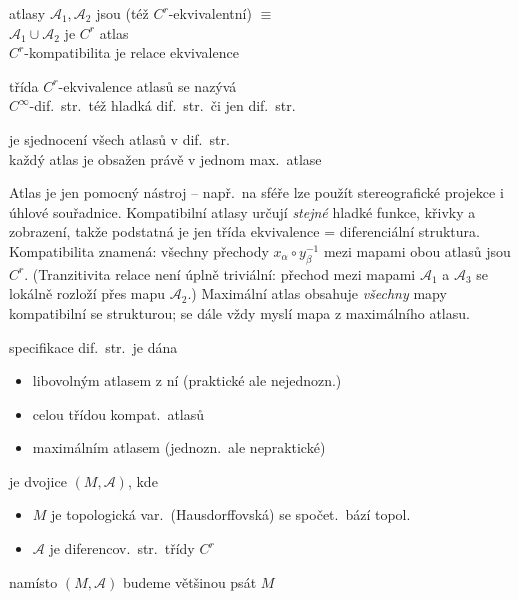 \begin{definice}
atlasy $\mathcal{A}_1,\mathcal{A}_2$ jsou  (též $C^r$-ekvivalentní) $\equiv$ \\
\quad $\mathcal{A}_1\cup\mathcal{A}_2$ je $C^r$ atlas \\
$C^r$-kompatibilita je relace ekvivalence
\end{definice}

\begin{definice}
třída $C^r$-ekvivalence atlasů se nazývá  \\
$C^\infty$-dif.\ str.\ též hladká dif.\ str.\ či jen dif.\ str.
\end{definice}

\begin{definice}
 je sjednocení všech atlasů v dif.\ str. \\
každý atlas je obsažen právě v jednom max.\ atlase
\end{definice}

\begin{vysvetleni}
Atlas je jen pomocný nástroj -- např.\ na sféře lze použít stereografické projekce i úhlové souřadnice. Kompatibilní atlasy určují \emph{stejné} hladké funkce, křivky a zobrazení, takže podstatná je jen třída ekvivalence = diferenciální struktura. Kompatibilita znamená: všechny  přechody $x_\alpha\circ y_\beta^{-1}$ mezi mapami obou atlasů jsou $C^r$. (Tranzitivita relace není úplně triviální: přechod mezi mapami $\mathcal{A}_1$ a $\mathcal{A}_3$ se lokálně rozloží přes mapu $\mathcal{A}_2$.) Maximální atlas obsahuje \emph{všechny} mapy kompatibilní se strukturou;  se dále vždy myslí mapa z maximálního atlasu.
\end{vysvetleni}

specifikace dif.\ str.\ je dána
\begin{itemize}[nosep]
  \item[--] libovolným atlasem z ní \hfill (praktické ale nejednozn.)
  \item[--] celou třídou kompat.\ atlasů
  \item[--] maximálním atlasem \hfill (jednozn.\ ale nepraktické)
\end{itemize}

\begin{definice}
 je dvojice $(M,\mathcal{A})$, kde
\begin{itemize}[nosep]
  \item[] $M$ je topologická var.\ (Hausdorffovská) se spočet.\ bází topol.
  \item[] $\mathcal{A}$ je diferencov.\ str.\ třídy $C^r$
\end{itemize}
namísto $(M,\mathcal{A})$ budeme většinou psát $M$
\end{definice}

